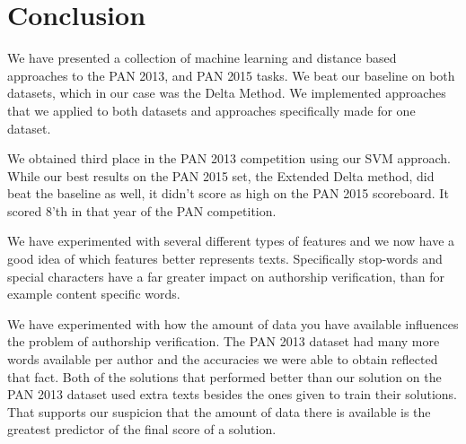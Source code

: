 \section{Conclusion} \label{sec:conclusion}

We have presented a collection of machine learning and distance based approaches
to the PAN 2013, and PAN 2015 tasks. We beat our baseline on both datasets,
which in our case was the Delta Method. We implemented approaches that we
applied to both datasets and approaches specifically made for one dataset.

We obtained third place in the PAN 2013 competition using our \gls{SVM}
approach. While our best results on the PAN 2015 set, the Extended Delta
method, did beat the baseline as well, it didn't score as high on the PAN 2015
scoreboard. It scored 8'th in that year of the PAN competition.

We have experimented with several different types of features and we now have
a good idea of which features better represents texts. Specifically stop-words
and special characters have a far greater impact on authorship verification,
than for example content specific words.

We have experimented with how the amount of data you have available influences
the problem of authorship verification. The PAN 2013 dataset had many more words
available per author and the accuracies we were able to obtain reflected that
fact. Both of the solutions that performed better than our solution on the PAN
2013 dataset used extra texts besides the ones given to train their solutions.
That supports our suspicion that the amount of data there is available
is the greatest predictor of the final score of a solution.
